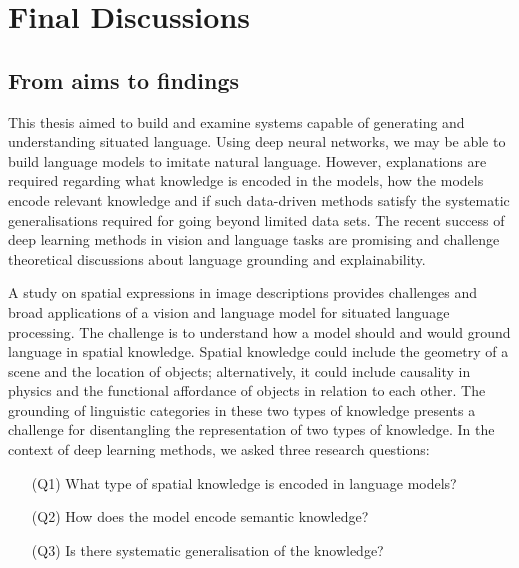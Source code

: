 \chapter{Final Discussions}
\label{sec:conclusion}


\section{From aims to findings}
This thesis aimed to build and examine systems capable of generating and understanding situated language. 
Using deep neural networks, we may be able to build language models to imitate natural language. 
However, explanations are required regarding what knowledge is encoded in the models, how the models encode relevant knowledge and if such data-driven methods satisfy the systematic generalisations required for going beyond limited data sets. 
The recent success of deep learning methods in vision and language tasks are promising and challenge theoretical discussions about language grounding and explainability. 

A study on spatial expressions in image descriptions provides challenges and broad applications of a vision and language model for situated language processing. 
The challenge is to understand how a model should and would ground language in spatial knowledge. 
Spatial knowledge could include the geometry of a scene and the location of objects; 
alternatively, it could include causality in physics and the functional affordance of objects in relation to each other. 
The grounding of linguistic categories in these two types of knowledge presents a challenge for disentangling the representation of two types of knowledge. 
In the context of deep learning methods, we asked three research questions:
\begin{itemize}
	\item[(Q1)] What type of spatial knowledge is encoded in language models?
	\item[(Q2)] How does the model encode semantic knowledge?
	\item[(Q3)] Is there systematic generalisation of the knowledge?
\end{itemize}

